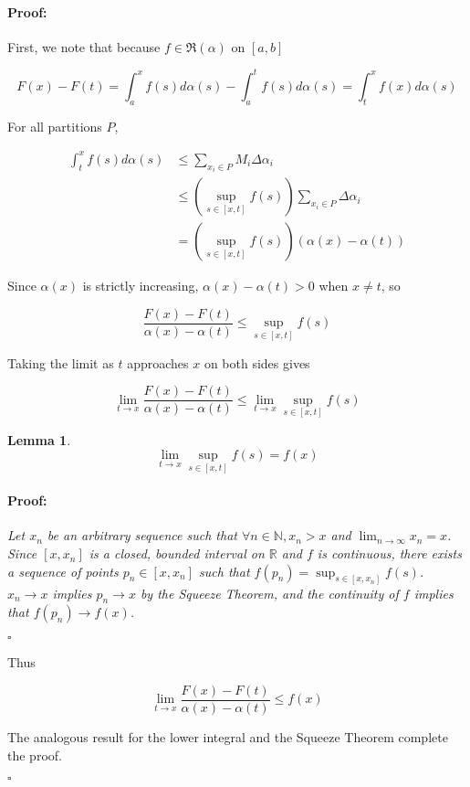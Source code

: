 \documentclass{article}
\newcommand{\RiemannIntable}{
  \mathfrak{R}
}
\newenvironment{proof}{\paragraph{Proof:}}{\hfill$\square$}
\newtheorem{lemma}[theorem]{Lemma}
\begin{document}
\begin{proof}

First, we note that because $f \in \RiemannIntable(\alpha)$ on $[a, b]$

\[F(x) - F(t) = \int_a^x f(s)d\alpha(s) - \int_a^t f(s) d\alpha(s) = \int_t^x f(x) d\alpha(s)
\]

For all partitions $P$,

\begin{align*}
\int_t^x f(s) d\alpha(s)
& \leq \sum_{x_i \in P} M_i \Delta \alpha_i \\
& \leq \left(\sup_{s \in [x, t]} f(s) \right) \sum_{x_i \in P} \Delta \alpha_i \\
&= \left(\sup_{s \in [x, t]} f(s) \right) (\alpha(x) - \alpha(t))
\end{align*}

Since $\alpha(x)$ is strictly increasing, $\alpha(x) - \alpha(t) > 0$ when $x \neq t$, so

\[
\frac{F(x) - F(t)}{\alpha(x) - \alpha(t)} \leq \sup_{s \in [x, t]} f(s)
\]

Taking the limit as $t$ approaches $x$ on both sides gives

\[
\lim_{t \to x} \frac{F(x) - F(t)}{\alpha(x) - \alpha(t)} \leq \lim_{t \to x} \sup_{s \in [x, t]} f(s)
\]

\begin{lemma}

\[
\lim_{t \to x} \sup_{s \in [x, t]} f(s) = f(x)
\]

\begin{proof}

Let $x_n$ be an arbitrary sequence such that $\forall n \in \mathbb{N}, x_n > x$ and $\lim_{n \to \infty} x_n = x$. Since $[x, x_n]$ is a closed, bounded interval on $\mathbb{R}$ and $f$ is continuous, there exists a sequence of points $p_n \in [x, x_n]$ such that $f(p_n) =  \sup_{s \in [x, x_n]} f(s)$. $x_n \rightarrow x$ implies $p_n \rightarrow x$ by the Squeeze Theorem, and the continuity of $f$ implies that $f(p_n) \rightarrow f(x)$.

\end{proof}
\end{lemma}

Thus

\[
\lim_{t \to x} \frac{F(x) - F(t)}{\alpha(x) - \alpha(t)} \leq f(x)
\]

The analogous result for the lower integral and the Squeeze Theorem complete the proof.

\end{proof}
\end{document}
